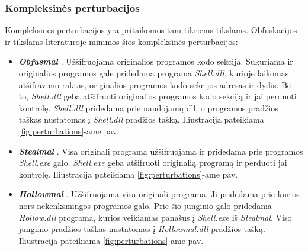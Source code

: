 \subsubsection{Kompleksinės perturbacijos}\label{sec:literature:perturbations:complex}
Kompleksinės perturbacijos yra pritaikomos tam tikriems tikslams. Obfuskacijos ir  tikslams literatūroje minimos šios kompleksinės perturbacijos:
\begin{itemize}
    \item \textbf{\textit{Obfusmal}} \cite{zhongMalFoxCamouflagedAdversarial2024}. Užšifruojama originalios programos kodo sekcija. Sukuriama ir originalios programos gale pridedama programa \textit{Shell.dll}, kurioje laikomas atšifravimo raktas, originalios programos kodo sekcijos adresas ir dydis. Be to, \textit{Shell.dll} geba atšifruoti originalios programos kodo sekciją ir jai perduoti kontrolę. \textit{Shell.dll} pridedama prie naudojamų \acs{dll}, o programos pradžios taškas nustatomas į \textit{Shell.dll} pradžios tašką. Iliustracija pateikiama \ref{fig:perturbations}-ame pav.
    \item \textbf{\textit{Stealmal}} \cite{zhongMalFoxCamouflagedAdversarial2024}. Visa originali programa užšifruojama ir pridedama prie programos \textit{Shell.exe} galo. \textit{Shell.exe} geba atšifruoti originalią programą ir perduoti jai kontrolę. Iliustracija pateikiama \ref{fig:perturbations}-ame pav.
    \item \textbf{\textit{Hollowmal}} \cite{zhongMalFoxCamouflagedAdversarial2024}. Užšifruojama visa originali programa. Ji pridedama prie kurios nors nekenksmingos programos galo. Prie šio junginio galo pridedama \textit{Hollow.dll} programa, kurios veikiamas panašus į \textit{Shell.exe} iš \textit{Stealmal}. Viso junginio pradžios taškas nustatomas į \textit{Hollowmal.dll} pradžios tašką. Iliustracija pateikiama \ref{fig:perturbations}-ame pav.
\end{itemize}

